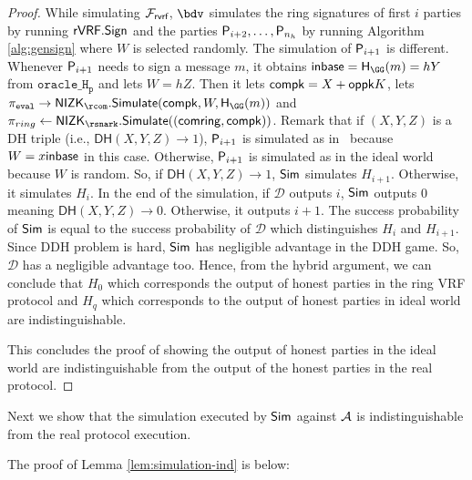 \begin{proof}
	
	While simulating $ \mathcal{F}_{\textsf{rvrf}} $, $\bdv $ simulates the ring signatures of first $ i $ parties by running $ {\mathsf{rVRF}}.{\mathsf{Sign}} $ and the parties $ \mathsf{P}_{i+2}, \ldots, \mathsf{P}_{n_h} $ by running Algorithm \ref{alg:gensign} where $ W $ is selected randomly. The simulation of $ \mathsf{P}_{i + 1} $ is different.  Whenever $ \mathsf{P}_{i+1} $ needs to sign a message $ m$, it obtains $ \In = \hashG(m) = hY $ from $ \mathtt{oracle\_H_p} $ and lets $ W = hZ $. Then it lets $ \mathsf{compk} = X + \mathsf{oppk}K $, lets  $ \pieval \rightarrow \NIZK_{\rcom}.\Simulate(\compk,W,\hashG(m)) $ and  $ \pi_{ring} \leftarrow \NIZK_{\rsnark}.\Simulate((\comring, \compk)) $.  Remark that if $ (X,Y,Z)$ is a DH triple (i.e., $  \mathsf{DH}(X,Y,Z) \rightarrow 1 $), $ \mathsf{P}_{i+1} $ is simulated as in \name \ because $ W = x{\mathsf{inbase}}$ in this case. Otherwise, $ \mathsf{P}_{i+1} $ is simulated as in the ideal world because $ W $ is random. So, if $  \mathsf{DH}(X,Y,Z)  \rightarrow 1$, $\mathsf{Sim} $ simulates $ H_{i+1} $. Otherwise, it simulates $ H_{i} $. In the end of the simulation, if $ \mathcal{D} $ outputs $ i $, $\mathsf{Sim} $ outputs $ 0 $ meaning $  \mathsf{DH}(X,Y,Z) \rightarrow 0$. Otherwise, it outputs $ i + 1 $. The success probability of $\mathsf{Sim} $ is equal to the success probability of $\mathcal{D} $ which distinguishes $ H_i $ and $ H_{i +1} $. Since DDH problem is hard, $\mathsf{Sim} $ has negligible advantage in the DDH game. So, $ \mathcal{D} $ has a negligible advantage too. Hence, from the hybrid argument, we can conclude that $ H_0    $ which corresponds the output of honest parties in  the ring VRF protocol and $ H_q  $ which corresponds to  the output of honest parties in ideal world are indistinguishable.
	
	This concludes the proof of showing the output of honest parties in the ideal world are indistinguishable from the output of the honest parties in the real protocol.
\end{proof}	

Next we show that the simulation executed by $ \mathsf{Sim} $ against $ \mathcal{A} $ is indistinguishable from the real protocol execution.

The proof of Lemma \ref{lem:simulation-ind} is below:


